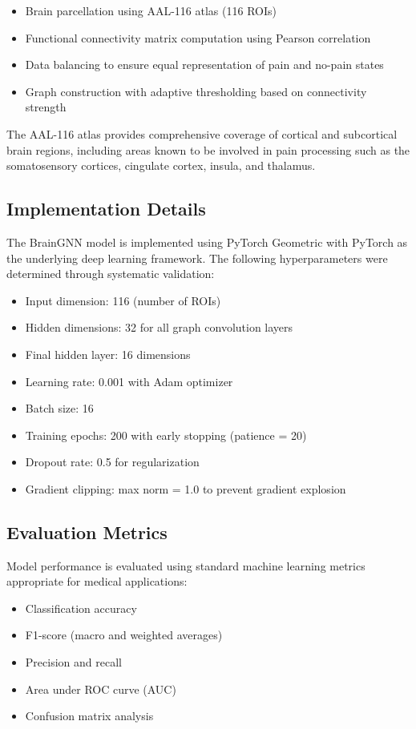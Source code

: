 \documentclass[10pt,journal,compsoc]{IEEEtran}
\begin{document}
\begin{itemize}
\item Brain parcellation using AAL-116 atlas \cite{tzourio2002automated} (116 ROIs)
\item Functional connectivity matrix computation using Pearson correlation
\item Data balancing to ensure equal representation of pain and no-pain states
\item Graph construction with adaptive thresholding based on connectivity strength
\end{itemize}

The AAL-116 atlas provides comprehensive coverage of cortical and subcortical brain regions, including areas known to be involved in pain processing such as the somatosensory cortices, cingulate cortex, insula, and thalamus.

\subsection{Implementation Details}

The BrainGNN model is implemented using PyTorch Geometric \cite{fey2019fast} with PyTorch \cite{paszke2019pytorch} as the underlying deep learning framework. The following hyperparameters were determined through systematic validation:

\begin{itemize}
\item Input dimension: 116 (number of ROIs)
\item Hidden dimensions: 32 for all graph convolution layers
\item Final hidden layer: 16 dimensions
\item Learning rate: 0.001 with Adam optimizer
\item Batch size: 16
\item Training epochs: 200 with early stopping (patience = 20)
\item Dropout rate: 0.5 for regularization
\item Gradient clipping: max norm = 1.0 to prevent gradient explosion
\end{itemize}

\subsection{Evaluation Metrics}

Model performance is evaluated using standard machine learning metrics appropriate for medical applications:
\begin{itemize}
\item Classification accuracy
\item F1-score (macro and weighted averages)
\item Precision and recall
\item Area under ROC curve (AUC)
\item Confusion matrix analysis
\end{itemize}
\end{document}
